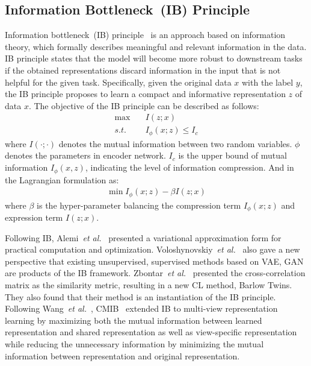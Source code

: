 \documentclass[10pt,twocolumn,letterpaper]{article}
\begin{document}
\subsection{Information Bottleneck~(IB) Principle}
Information bottleneck~(IB) principle~\cite{tishby99information,shwartz2017opening,alemi2017vib,voloshynovskiy2020variational} is an approach based on information theory, which formally describes meaningful and relevant information in the data. IB principle states that the model will become more robust to downstream tasks if the obtained representations discard information in the input that is not helpful for the given task. Specifically, given the original data $x$ with the label $y$, the IB principle proposes to learn a compact and informative representation $z$ of data $x$. The objective of the IB principle can be described as follows:
\begin{align}
    \max &\quad I(z;x) \nonumber\\
    s.t. &\quad I_{\phi}(x;z)\le I_c
\end{align}
where $I(\cdot ;\cdot)$ denotes the mutual information between two random variables. $\phi$ denotes the parameters in encoder network. $I_c$ is the upper bound of mutual information $I_{\phi}(x,z)$, indicating the level of information compression. And in the Lagrangian formulation as:
\begin{align}
    \min I_{\phi}(x;z)-\beta I(z;x)
\end{align}
where $\beta$ is the hyper-parameter balancing the compression term $I_{\phi}(x;z)$ and expression term $I(z;x)$.

Following IB, Alemi~\textit{et al.}~\cite{alemi2017vib} presented a variational approximation form for practical computation and optimization. Voloshynovskiy~\textit{et al.}~\cite{voloshynovskiy2020variational} also gave a new perspective that existing unsupervised, supervised methods based on VAE, GAN are products of the IB framework. Zbontar~\textit{et al.}~\cite{zbontar2021barlow} presented the cross-correlation matrix as the similarity metric, resulting in a new CL method, Barlow Twins. They also found that their method is an instantiation of the IB principle. Following Wang~\textit{et al.}~\cite{wang2019deep}, CMIB~\cite{wan2021multi} extended IB to multi-view representation learning by maximizing both the mutual information between learned representation and shared representation as well as view-specific representation while reducing the unnecessary information by minimizing the mutual information between representation and original representation.
\end{document}
